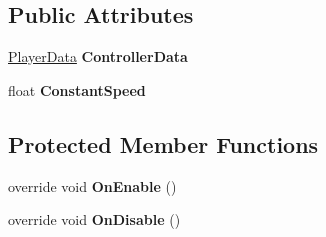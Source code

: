 \subsection*{Public Attributes}
\begin{DoxyCompactItemize}
\item 
\hypertarget{class_skyrates_1_1_a_i_1_1_custom_1_1_user_controlled_a72674c0c3e823f54bcf57fe0b75477b6}{\hyperlink{class_skyrates_1_1_data_1_1_player_data}{Player\-Data} {\bfseries Controller\-Data}}\label{class_skyrates_1_1_a_i_1_1_custom_1_1_user_controlled_a72674c0c3e823f54bcf57fe0b75477b6}

\item 
\hypertarget{class_skyrates_1_1_a_i_1_1_custom_1_1_user_controlled_ac0607a2a8bdd1bf424bc14741954874f}{float {\bfseries Constant\-Speed}}\label{class_skyrates_1_1_a_i_1_1_custom_1_1_user_controlled_ac0607a2a8bdd1bf424bc14741954874f}

\end{DoxyCompactItemize}
\subsection*{Protected Member Functions}
\begin{DoxyCompactItemize}
\item 
\hypertarget{class_skyrates_1_1_a_i_1_1_custom_1_1_user_controlled_ab02bb305b548a041dc9ac04f9ce8f814}{override void {\bfseries On\-Enable} ()}\label{class_skyrates_1_1_a_i_1_1_custom_1_1_user_controlled_ab02bb305b548a041dc9ac04f9ce8f814}

\item 
\hypertarget{class_skyrates_1_1_a_i_1_1_custom_1_1_user_controlled_a4323e79b292e59816af9fd7ea084818d}{override void {\bfseries On\-Disable} ()}\label{class_skyrates_1_1_a_i_1_1_custom_1_1_user_controlled_a4323e79b292e59816af9fd7ea084818d}

\end{DoxyCompactItemize}


